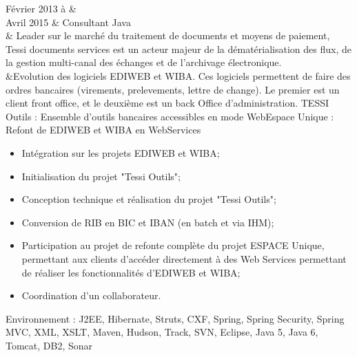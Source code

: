 Février 2013 à &  \\%
Avril 2015     & Consultant Java \\%
			   & Leader sur le marché du traitement de documents et moyens de paiement, 
			   Tessi documents services est un acteur majeur de la dématérialisation des flux, 
			   de la gestion multi-canal des échanges et de l'archivage électronique. \\%
			   &Evolution des logiciels EDIWEB et WIBA. Ces logiciels permettent de faire des ordres bancaires (virements, prelevements, lettre de change).
			   Le premier est un client  front office, et le deuxième est un back Office d'administration.
			   TESSI Outils : 
			   Ensemble d'outils bancaires accessibles en mode WebEspace Unique : Refont de EDIWEB et WIBA en WebServices%
			   \begin{itemize}%
    				\item Intégration sur les projets EDIWEB et WIBA;%
    				\item Initialisation du projet "Tessi Outils";%
    				\item Conception technique et réalisation du projet "Tessi Outils";%
    				\item Conversion de RIB en BIC et IBAN (en batch et via IHM);%
    				\item Participation au projet de refonte complète du projet ESPACE Unique, permettant aux clients d'accéder 
    				directement à des Web Services permettant de réaliser les fonctionnalités d'EDIWEB et WIBA;%
    				\item Coordination d'un collaborateur.%
			   \end{itemize}%
Environnement : J2EE, Hibernate, Struts, CXF, Spring, Spring Security, Spring MVC, XML, XSLT, Maven, Hudson, Track, SVN, Eclipse, Java 5, Java 6, Tomcat, DB2, Sonar
